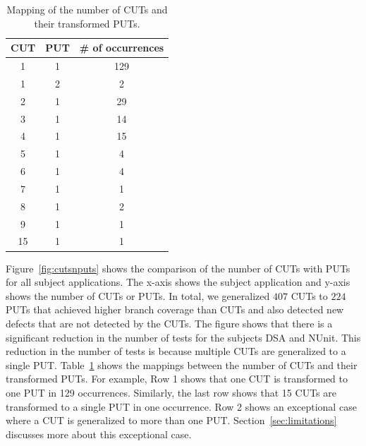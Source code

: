 \begin{table}[t]
\begin{CodeOut}
\begin{center}
\centering 
\begin {tabular} {|c|c|c|}
\hline \textbf{CUT} & \textbf{PUT} & \textbf{\# of occurrences}\\
\hline
\hline 1   & 1   & 129\\
\hline 1   & 2   & 2\\
\hline 2   & 1   & 29\\
\hline 3   & 1   & 14\\
\hline 4   & 1   & 15\\
\hline 5   & 1   & 4\\
\hline 6   & 1   & 4\\
\hline 7   & 1   & 1\\
\hline 8   & 1   & 2\\
\hline 9   & 1   & 1\\
\hline 15   & 1   & 1\\
\hline
\end{tabular}\vspace*{-2ex}
\caption {\label{tab:cutputmapping} Mapping of the number of CUTs and their transformed PUTs.} \vspace*{-4ex}
\end{center}
\end{CodeOut}
\end{table}

Figure~\ref{fig:cutsnputs} shows the comparison of the number of CUTs with PUTs for all subject applications. The x-axis shows the subject application and y-axis shows the number of CUTs or PUTs. In total, we generalized $407$ CUTs to $224$ PUTs that achieved higher branch coverage than CUTs and also detected new defects that are not detected by the CUTs. The figure shows that there is a significant reduction in the number of tests for the subjects DSA and NUnit. This reduction in the number of tests is because multiple CUTs are generalized to a single PUT. Table~\ref{tab:cutputmapping} shows the mappings between the number of CUTs and their transformed PUTs. For example, Row 1 shows that one CUT is transformed to one PUT in 129 occurrences. Similarly, the last row shows that 15 CUTs are transformed to a single PUT in one occurrence. Row 2 shows an exceptional case where a CUT is generalized to more than one PUT. Section~\ref{sec:limitations} discusses more about this exceptional case. 

